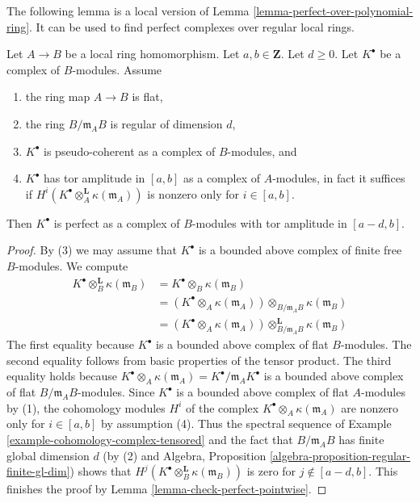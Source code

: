 \noindent
The following lemma is a local version of
Lemma \ref{lemma-perfect-over-polynomial-ring}.
It can be used to find perfect complexes over regular local rings.

\begin{lemma}
\label{lemma-perfect-over-regular-local-ring}
Let $A \to B$ be a local ring homomorphism.
Let $a, b \in \mathbf{Z}$. Let $d \geq 0$.
Let $K^\bullet$ be a complex of $B$-modules. Assume
\begin{enumerate}
\item the ring map $A \to B$ is flat,
\item the ring $B/\mathfrak m_AB$ is regular of dimension $d$,
\item $K^\bullet$ is pseudo-coherent as a complex of $B$-modules, and
\item $K^\bullet$ has tor amplitude in $[a, b]$ as a complex
of $A$-modules, in fact it suffices if
$H^i(K^\bullet \otimes_A^\mathbf{L} \kappa(\mathfrak m_A))$
is nonzero only for $i \in [a, b]$.
\end{enumerate}
Then $K^\bullet$ is perfect as a complex of $B$-modules
with tor amplitude in $[a - d, b]$.
\end{lemma}

\begin{proof}
By (3) we may assume that $K^\bullet$ is a bounded above complex of finite free
$B$-modules. We compute
\begin{align*}
K^\bullet \otimes_B^{\mathbf{L}} \kappa(\mathfrak m_B)
& = K^\bullet \otimes_B \kappa(\mathfrak m_B) \\
& = (K^\bullet \otimes_A \kappa(\mathfrak m_A))
\otimes_{B/\mathfrak m_A B} \kappa(\mathfrak m_B) \\
& = (K^\bullet \otimes_A \kappa(\mathfrak m_A))
\otimes^{\mathbf{L}}_{B/\mathfrak m_A B} \kappa(\mathfrak m_B)
\end{align*}
The first equality because $K^\bullet$ is a bounded above complex
of flat $B$-modules. The second equality follows from basic 
properties of the tensor product. The third equality holds because
$K^\bullet \otimes_A \kappa(\mathfrak m_A) =
K^\bullet/ \mathfrak m_A K^\bullet$ is a bounded above complex
of flat $B/\mathfrak m_A B$-modules. Since $K^\bullet$ is a bounded
above complex of flat $A$-modules by (1), the cohomology modules $H^i$
of the complex $K^\bullet \otimes_A \kappa(\mathfrak m_A)$ are nonzero only
for $i \in [a, b]$ by assumption (4). Thus the spectral sequence
of Example \ref{example-cohomology-complex-tensored} and the
fact that $B/\mathfrak m_AB$ has finite global dimension $d$
(by (2) and
Algebra, Proposition \ref{algebra-proposition-regular-finite-gl-dim})
shows that $H^j(K^\bullet \otimes_B^{\mathbf{L}} \kappa(\mathfrak m_B))$
is zero for $j \not \in [a - d, b]$.
This finishes the proof by Lemma \ref{lemma-check-perfect-pointwise}.
\end{proof}





